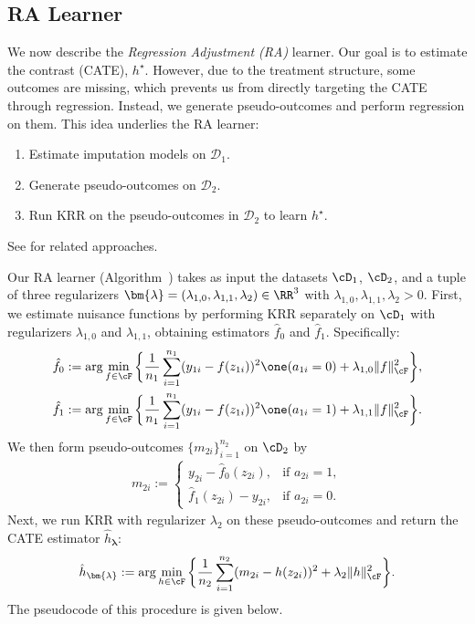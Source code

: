 \documentclass[12pt,a4paper,pdftex,onepage]{article}
\begin{document}
\subsection{RA Learner}

We now describe the \emph{Regression Adjustment (RA)} learner. 
Our goal is to estimate the contrast (CATE), $h^{\star}$.  
However, due to the treatment structure, some outcomes are missing, which prevents us from directly targeting the CATE through regression.
Instead, we generate pseudo-outcomes and perform regression on them.
This idea underlies the RA learner:
\begin{enumerate}
\item Estimate imputation models on $\mathcal{D}_1$.
\item Generate pseudo-outcomes on $\mathcal{D}_2$.
\item Run KRR on the pseudo-outcomes in \(\mathcal{D}_2\) to learn \(h^\star\).
\end{enumerate}
See \cite{kunzel2019metalearners,kennedy2020towards,curth2021nonparametric} for related approaches.

Our RA learner (Algorithm~) takes as input the datasets \(\cD_1\), \(\cD_2\), and a tuple of three regularizers \(\bm{\lambda }  = (\lambda_{1,0}, \lambda_{1,1}, \lambda_2) \in \RR^3\) with \(\lambda_{1,0}, \lambda_{1,1}, \lambda_2 >0\).  
First, we estimate nuisance functions by performing KRR separately on \(\cD_1\) with regularizers \(\lambda_{1,0}\) and \(\lambda_{1,1}\), obtaining estimators \(\hat{f}_0\) and \(\hat{f}_1\).  
Specifically:
\begin{align}\label{equation; RA learner algorithm}
\hat{f}_0 &:= \arg\min_{f \in \cF} \bigg\{ \frac{1}{n_1} \sum_{i=1}^{n_1} (y_{1i} -f(z_{1i}))^2 \one(a_{1i}=0) + \lambda_{1,0} \| f\|_{\cF}^2 \bigg\}, \\
\hat{f}_1 &:= \arg \min_{f \in \cF} \bigg\{\frac{1}{n_1} \sum_{i=1}^{n_1} (y_{1i} -f(z_{1i}))^2\one(a_{1i}=1)  + \lambda_{1,1} \| f\|_{\cF}^2\bigg\}. 
\label{equation; RA learner algorithm 2}
\end{align}
We then form pseudo-outcomes \(\{m_{2i}\}_{i=1}^{n_2}\) on $\cD_2$ by 
\begin{align*}
m_{2i} := 
\begin{cases}
y_{2i} - \hat{f}_0(z_{2i}), & \text{if } a_{2i} = 1,\\[6pt]
\hat{f}_1(z_{2i}) - y_{2i}, & \text{if } a_{2i} = 0.
\end{cases}
\end{align*}
Next, we run KRR with regularizer \(\lambda_2\) on these pseudo-outcomes and return the CATE estimator \(\hat{h}_{\bm{\lambda}}\):
\begin{align*}
\hat{h}_{\bm{\lambda}} := \arg \min_{h \in \cF} \bigg\{ \frac{1}{n_2} \sum_{i=1}^{n_2} (m_{2i}-h(z_{2i}))^2  + \lambda_2 \| h\|_\cF^2 \bigg\}.
\end{align*}
The pseudocode of this procedure is given below.
\end{document}
